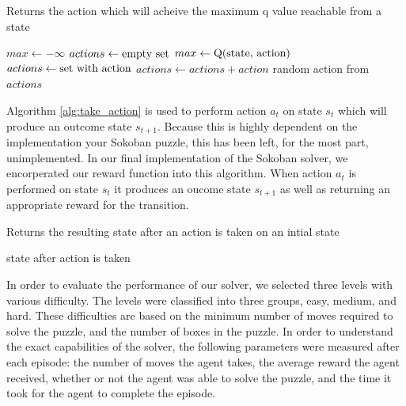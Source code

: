 \documentclass[times, 10pt,twocolumn]{article}
\begin{document}
\begin{algorithm}
  \caption{Returns the action which will acheive the maximum q value reachable from a state}
  \begin{algorithmic}[5]
      \State $max\gets -\infty$
      \State $actions\gets \textnormal{empty set}$
          \State $max\gets \textnormal{Q(state, action)}$
          \State $actions\gets \textnormal{set with action}$
        \Else
          \State $actions\gets actions + action$
        \EndIf
      \EndFor
      \State \Return random action from $actions$
    \EndFunction
  \end{algorithmic}
  \label{alg:maximize_action}
\end{algorithm}

Algorithm \ref{alg:take_action} is used to perform action $a_t$ on state $s_t$ which will produce an outcome state $s_{t+1}$.  Because this is highly dependent on the implementation your Sokoban puzzle, this has been left, for the most part, unimplemented.  In our final implementation of the Sokoban solver, we encorperated our reward function into this algorithm.  When action $a_t$ is performed on state $s_t$ it produces an oucome state $s_{t+1}$ as well as returning an appropriate reward for the transition.

\begin{algorithm}
  \caption{Returns the resulting state after an action is taken on an intial state}
  \begin{algorithmic}[6]
      \State \Return state after action is taken
    \EndFunction
  \end{algorithmic}
  \label{alg:take_action}
\end{algorithm}


In order to evaluate the performance of our solver, we selected three levels with various difficulty. The levels were classified into three groups, easy, medium, and hard. These difficulties are based on the minimum number of moves required to solve the puzzle, and the number of boxes in the puzzle. In order to understand the exact capabilities of the solver, the following parameters were measured after each episode: the number of moves the agent takes, the average reward the agent received, whether or not the agent was able to solve the puzzle, and the time it took for the agent to complete the episode. 
\end{document}
